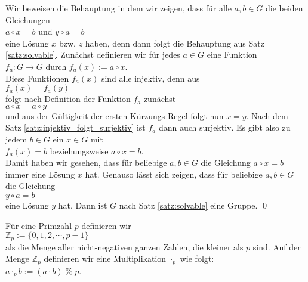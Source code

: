 \proof Wir beweisen die Behauptung in dem wir zeigen, dass f\"{u}r alle $a,b \in G$ die beiden Gleichungen
\\[0.2cm]
\hspace*{1.3cm} $a \circ x = b$ \quad und \quad $y \circ a = b$
\\[0.2cm]
eine L\"{o}sung $x$ bzw. $z$ haben, denn dann folgt die Behauptung aus Satz \ref{satz:solvable}.  Zun\"{a}chst definieren wir f\"{u}r
jedes $a \in G$ eine Funktion
\\[0.2cm]
\hspace*{1.3cm} $f_a: G \rightarrow G$ \quad durch \quad $f_a(x) := a \circ x$.
\\[0.2cm]
Diese Funktionen $f_a(x)$ sind alle injektiv, denn aus
\\[0.2cm]
\hspace*{1.3cm} $f_a(x) = f_a(y)$
\\[0.2cm]
folgt nach Definition der Funktion $f_a$ zun\"{a}chst
\\[0.2cm]
\hspace*{1.3cm} $a \circ x = a \circ y$
\\[0.2cm]
und aus der G\"{u}ltigkeit der ersten K\"{u}rzungs-Regel folgt nun $x = y$.  Nach dem Satz
\ref{satz:injektiv_folgt_surjektiv} ist $f_a$ dann auch surjektiv.  Es gibt also zu jedem $b \in G$
ein $x \in G$ mit 
\\[0.2cm]
\hspace*{1.3cm} $f_a(x) = b$ \quad beziehungsweise \quad $a \circ x = b$.
\\[0.2cm]
Damit haben wir gesehen, dass f\"{u}r beliebige $a,b \in G$ die Gleichung $a \circ x = b$ immer eine L\"{o}sung
$x$ hat.  Genauso l\"{a}sst sich  zeigen, dass f\"{u}r beliebige $a,b \in G$ die Gleichung
\\[0.2cm]
\hspace*{1.3cm}
$y \circ a = b$
\\[0.2cm]
eine L\"{o}sung $y$ hat.  Dann ist $G$ nach Satz \ref{satz:solvable} eine Gruppe. \qed

\begin{Definition}
F\"{u}r eine Primzahl $p$ definieren wir
\\[0.2cm]
\hspace*{1.3cm}
$\mathbb{Z}_p := \{ 0, 1, 2, \cdots, p - 1 \}$
\\[0.2cm]
als die Menge aller nicht-negativen ganzen Zahlen, die kleiner als $p$ sind.  Auf der Menge
$\mathbb{Z}_p$ definieren wir eine Multiplikation $\cdot_p$ wie folgt:
\\[0.2cm]
\hspace*{1.3cm}
$a \cdot_p b := (a \cdot b) \;\mathtt{\%}\;p$.  \eoxs
\end{Definition}

